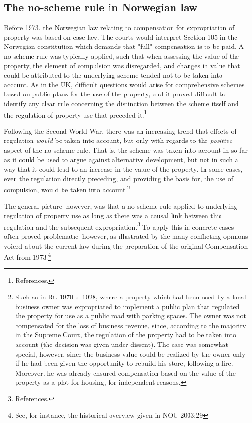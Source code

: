 \subsection{The no-scheme rule in Norwegian law}\label{sec:nonor}

Before 1973, the Norwegian law relating to compensation for expropriation of property was based on case-law. The courts would interpret Section 105 in the Norwegian constitution which demands that "full" compensation is to be paid. A no-scheme rule was typically applied, such that when assessing the value of the property, the element of compulsion was disregarded, and changes in value that could be attributed to the underlying scheme tended not to be taken into account. As in the UK, difficult questions would arise for comprehensive schemes based on public plans for the use of the property, and it proved difficult to identify any clear rule concerning the distinction between the scheme itself and the regulation of property-use that preceded it.\footnote{References.}

Following the Second World War, there was an increasing trend that effects of regulation \emph{would} be taken into account, but only with regards to the \emph{positive} aspect of the no-scheme rule. That is, the scheme was taken into account in so far as it could be used to argue against alternative development, but not in such a way that it could lead to an increase in the value of the property. In some cases, even the regulation directly preceding, and providing the basis for, the use of compulsion, would be taken into account.\footnote{Such as in Rt. 1970 s. 1028, where a property which had been used by a local business owner was expropriated to implement a public plan that regulated the property for use as a public road with parking spaces. The owner was not compensated for the loss of business revenue, since, according to the majority in the Supreme Court, the regulation of the property had to be taken into account (the decision was given under dissent). The case was somewhat special, however, since the business value could be realized by the owner only if he had been given the opportunity to rebuild his store, following a fire. Moreover, he was already ensured compensation based on the value of the property as a plot for housing, for independent reasons.}

The general picture, however, was that a no-scheme rule applied to underlying regulation of property use as long as there was a causal link between this regulation and the subsequent expropriation.\footnote{References. } To apply this in concrete cases often proved problematic, however, as illustrated by the many conflicting opinions voiced about the current law during the preparation of the original Compensation Act from 1973.\footnote{See, for instance, the historical overview given in NOU 2003:29}

